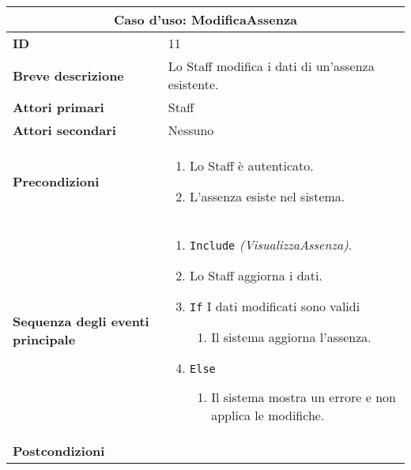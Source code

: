 \documentclass[a4paper]{report}
\begin{document}
\clearpage
\begin{table}[H]
\vspace*{-0cm}
\renewcommand{\arraystretch}{1.9}
\begin{tabular}{|p{3.9cm}|p{9.9cm}|}
\hline
\multicolumn{2}{|c|}{\textbf{Caso d’uso: ModificaAssenza}} \\ \hline
\textbf{ID} & 11 \\ \hline
\textbf{Breve descrizione} & Lo Staff modifica i dati di un’assenza esistente. \\ \hline
\textbf{Attori primari} & Staff \\ \hline
\textbf{Attori secondari} & Nessuno \\ \hline
\textbf{Precondizioni} & \begin{enumerate}[leftmargin=14pt,label=\arabic*.,labelsep=0.5em,topsep=0pt,partopsep=0pt,parsep=0pt,itemsep=0pt]
    \item Lo Staff è autenticato.
    \item L’assenza esiste nel sistema.
\end{enumerate} \\ \hline
\textbf{Sequenza degli eventi principale} & \begin{enumerate}[leftmargin=14pt,label=\arabic*.,labelsep=0.5em,topsep=0pt,partopsep=0pt,parsep=0pt,itemsep=0pt]
    \item \texttt{Include} \textit{(VisualizzaAssenza)}.
    \item Lo Staff aggiorna i dati.
    \item \texttt{If} I dati modificati sono validi
    \begin{enumerate}[label=\arabic{enumi}.\arabic*.,leftmargin=22pt,labelsep=0.5em,topsep=0pt,partopsep=0pt,parsep=0pt,itemsep=0pt]
        \item Il sistema aggiorna l’assenza.
    \end{enumerate}
    \item \texttt{Else}
    \begin{enumerate}[label=\arabic{enumi}.\arabic*.,leftmargin=22pt,labelsep=0.5em,topsep=0pt,partopsep=0pt,parsep=0pt,itemsep=0pt]
        \item Il sistema mostra un errore e non applica le modifiche.
    \end{enumerate}
\end{enumerate} \\ \hline
\textbf{Postcondizioni} & \begin{enumerate}[label=\arabic*.,leftmargin=14pt,labelsep=0.5em,topsep=0pt,partopsep=0pt,parsep=0pt,itemsep=0pt]

\end{enumerate}
\end{tabular}
\end{table}
\end{document}
